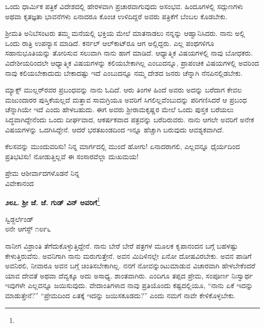 ಒಂದು ಧಾರ್ಮಿಕ ಪತ್ರಿಕೆ ವಿದೇಶದಲ್ಲಿ ಹೇರಳವಾಗಿ ಪ್ರಚಾರವಾಗುವುದು ಅಸಂಭವ. ಹಿಂದೂಗಳಲ್ಲಿ ಸದ್ಗುಣಗಳು ಅಥವಾ ಕೃತಜ್ಞತಾ ಭಾವನೆಗಳು ಏನಾದರೂ ಕೊಂಚ ಉಳಿದಿದ್ದರೆ ಅವರು ಪತ್ರಿಕೆಗೆ ಬೆಂಬಲ ಕೊಡಬೇಕು.

\vspace{0.1cm}

ಶ‍್ರೀಮತಿ ಅನಿಬೆಸಂಟರು ತಮ್ಮ ಮನೆಯಲ್ಲಿ ಭಕ್ತಿಯ ಮೇಲೆ ಮಾತನಾಡಲು ನನ್ನನ್ನು ಆಹ್ವಾನಿಸಿದರು. ನಾನು ಅಲ್ಲಿ ಒಂದು ರಾತ್ರಿ ಉಪನ್ಯಾಸ ಮಾಡಿದೆ. ಕರ್ನಲ್‌ ಆಲ್‌ಕಾಟ್‌ರೂ ಆಗ ಅಲ್ಲಿದ್ದರು. ಎಲ್ಲ ಪಂಥಗಳಿಗೂ ಸಹಾನುಭೂತಿಯನ್ನು ತೋರಿಸುವ ಸಲುವಾಗಿ ನಾನು ಹಾಗೆ ಮಾಡಿದೆ. ಆಧ್ಯಾತ್ಮಿಕ ವಿಷಯಗಳಲ್ಲಿ ನಾವು ಬೋಧಕರು. ವಿದೇಶೀಯರಿಂದಲೇ ಆಧ್ಯಾತ್ಮಿಕ ವಿಷಯಗಳನ್ನು ಕಲಿಯಬೇಕಾಗಿಲ್ಲ ಎಂಬುದನ್ನೂ, ಪ್ರಾಪಂಚಿಕ ವಿಷಯಗಳಲ್ಲಿ ಅವರಿಂದ ನಾವು ಕಲಿಯಬೇಕಾದುದು ಬೇಕಾದಷ್ಟು ಇದೆ ಎಂಬುದನ್ನೂ ನಮ್ಮ ದೇಶದ ಜನರು ಚೆನ್ನಾಗಿ ನೆನಪಿನಲ್ಲಿಡಬೇಕು.

\vspace{0.1cm}

ಮ್ಯಾಕ್ಸ್ ಮುಲ್ಲರ್‌ರವರ ಪ್ರಬಂಧವನ್ನು ನಾನು ಓದಿದೆ. ಆರು ತಿಂಗಳ ಹಿಂದೆ ಅವರು ಅದನ್ನು ಬರೆದಾಗ ಕೇವಲ ಮಜುಂದಾರರ ಪುಸ್ತಿಕೆಯಲ್ಲದೆ ಮತ್ತಾವ ಸಾಮಗ್ರಿಯೂ ಅವರಿಗೆ ಸಿಗಲಿಲ್ಲವೆಂಬುದನ್ನು ಪರಿಗಣಿಸಿದರೆ ಆ ಪ್ರಬಂಧ ಚೆನ್ನಾಗಿಯೇ ಇದೆ ಎಂದು ಹೇಳಬಹುದು. ಈಗ ಅವರು ಶ‍್ರೀರಾಮಕೃಷ್ಣರ ಮೇಲೆ ಒಂದು ಪುಸ್ತಕ ಬರೆಯಲು ಸಿದ್ಧವಾಗಿದ್ದೇನೆಂದು ಒಂದು ದೀರ್ಘವಾದ, ಆಕರ್ಷಕವಾದ ಪತ್ರವನ್ನು ಬರೆದಿರುವರು. ನಾನು ಆಗಲೇ ಅವರಿಗೆ ಅನೇಕ ವಿಷಯಗಳನ್ನು ಒದಗಿಸಿದ್ದೇನೆ. ಆದರೆ ಭರತಖಂಡದಿಂದ ಇನ್ನೂ ಹೆಚ್ಚಾಗಿ ಬರುವುದು ಆವಶ್ಯಕವಾಗಿದೆ.

\vspace{0.1cm}

ಕೆಲಸವನ್ನು ಮುಂದುವರಿಸು! ನಿನ್ನ ಮಾರ್ಗದಲ್ಲಿ ಮುಂದೆ ಹೋಗು! ಏನಾದರಾಗಲಿ, ಎಲ್ಲವನ್ನೂ ಧೈರ್ಯದಿಂದ ಪ್ರತಿಭಟಿಸು! ನೋಡುತ್ತಿಲ್ಲವೆ ಈ ಸಂಸಾರವೆಲ್ಲಾ ದುಃಖಮಯ!

{\flushright
ಪ್ರೇಮ ಆಶೀರ್ವಾದಗಳೊಡನೆ ನಿನ್ನ\\ವಿವೇಕಾನಂದ\par}

\begin{center}
\textbf{೨೮೭. ಶ‍್ರೀ ಜೆ. ಜೆ. ಗುಡ್ ವಿನ್ ಅವರಿಗೆ}\footnote{}
\end{center}

\begin{flushright}
ಸ್ವಿಡ್ಜರ್ಲೆಂಡ್\\೮ನೇ ಆಗಸ್ಟ್ ೧೮೯೬
\end{flushright}

ನಾನೀಗ ವಿಶ್ರಾಂತಿ ತೆಗೆದುಕೊಳ್ಳುತ್ತಿದ್ದೇನೆ. ನಾನು ಬೇರೆ ಬೇರೆ ಪತ್ರಗಳ ಮೂಲಕ ಕೃಪಾನಂದನ ಬಗ್ಗೆ ಬಹಳಷ್ಟು ಕೇಳುತ್ತಿರುವೆನು. ಅವನಿಗಾಗಿ ನಾನು ಮರುಗುತ್ತೇನೆ. ಅವನ ಮಿದಿಳಿನಲ್ಲೇ ಏನೋ ದೋಷವಿರಬೇಕು. ಅವನ ಪಾಡಿಗೆ ಅವನಿರಲಿ, ನೀವಾರೂ ಅವನ ಬಗ್ಗೆ ಚಿಂತಿಸಬೇಕಾಗಿಲ್ಲ. ನನಗೆ ನೋವನ್ನುಂಟುಮಾಡುವ ವಿಚಾರವಾಗಿ ಹೇಳಬೇಕೆಂದರೆ ಯಾವ ದೇವತೆ ಅಥವಾ ದೆವ್ವಕ್ಕೂ ಅದು ಅಸಾಧ್ಯ. ಶಾಂತವಾಗಿರು. ಎಂದಿಗೂ ತಪ್ಪದ ಪ್ರೇಮ, ಸಂಪೂರ್ಣ ನಿಃಸ್ವಾರ್ಥ ಇವುಗಳೇ ಎಲ್ಲವನ್ನೂ ಜಯಿಸುವುದು. ವೇದಾಂತಿಗಳಾದ ನಾವು ಪ್ರತಿಯೊಂದು ಕಷ್ಟದಲ್ಲಿಯೂ, “ನಾನು ಏಕೆ ಇದನ್ನು ಮಾಡುತ್ತೇನೆ?'' ``ಪ್ರೇಮದಿಂದ ಏತಕ್ಕೆ ಇದನ್ನು ಜಯಿಸಕೂಡದು?'' ಎಂದು ನಮಗೆ ನಾವೇ ಕೇಳಿಕೊಳ್ಳಬೇಕು.


